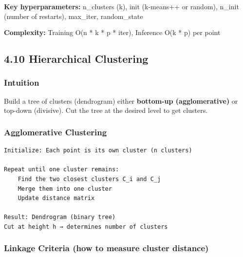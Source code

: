 \documentclass[11pt]{article}
\begin{document}
\textbf{Key hyperparameters:} n\_clusters (k), init (k-means++ or random), n\_init (number of restarts), max\_iter, random\_state

\textbf{Complexity:} Training O(n * k * p * iter), Inference O(k * p) per point

\subsection{4.10 Hierarchical Clustering}\label{410-hierarchical-clustering}

\subsubsection{Intuition}\label{intuition-9}

Build a tree of clusters (dendrogram) either \textbf{bottom-up (agglomerative)} or top-down (divisive). Cut the tree at the desired level to get clusters.

\subsubsection{Agglomerative Clustering}\label{agglomerative-clustering}

\setcodelang{}

\begin{verbatim}
Initialize: Each point is its own cluster (n clusters)

Repeat until one cluster remains:
    Find the two closest clusters C_i and C_j
    Merge them into one cluster
    Update distance matrix

Result: Dendrogram (binary tree)
Cut at height h → determines number of clusters
\end{verbatim}

\subsubsection{Linkage Criteria (how to measure cluster distance)}\label{linkage-criteria-how-to-measure-cluster-distance}
\end{document}
